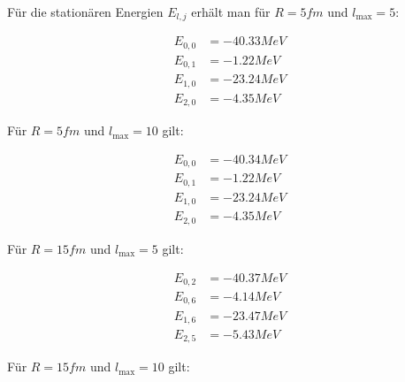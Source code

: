 Für die stationären Energien $E_{l,j}$ erhält man für $R =
\unit{5}{fm}$ und $l_{\max} = 5$:

\begin{align}
  E_{0,0} &= \unit{-40.33}{MeV} \\
  E_{0,1} &= \unit{-1.22}{MeV} \\
  E_{1,0} &= \unit{-23.24}{MeV} \\
  E_{2,0} &= \unit{-4.35}{MeV}
\end{align}

Für $R = \unit{5}{fm}$ und $l_{\max} = 10$ gilt:

\begin{align}
  E_{0,0} &= \unit{-40.34}{MeV} \\
  E_{0,1} &= \unit{-1.22}{MeV} \\
  E_{1,0} &= \unit{-23.24}{MeV} \\
  E_{2,0} &= \unit{-4.35}{MeV}
\end{align}





Für $R = \unit{15}{fm}$ und $l_{\max} = 5$ gilt:

\begin{align}
  E_{0,2} &= \unit{-40.37}{MeV} \\
  E_{0,6} &= \unit{-4.14}{MeV} \\
  E_{1,6} &= \unit{-23.47}{MeV} \\
  E_{2,5} &= \unit{-5.43}{MeV}
\end{align}

Für $R = \unit{15}{fm}$ und $l_{\max} = 10$ gilt:

